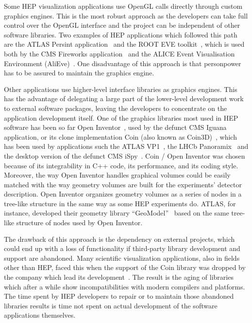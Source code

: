 \documentclass[12pt,a4paper]{article}
\begin{document}
Some HEP visualization applications use OpenGL calls directly through custom graphics engines. This is the most
robust approach as the developers can take full control over the OpenGL interface
and the project can be independent of other software libraries. Two examples of  HEP applications which followed this path are the
ATLAS Persint application~\cite{ATLASPersint2012} and the ROOT EVE toolkit~\cite{ROOTEVE2007}, which is used both by the CMS
Fireworks application~\cite{CMSFireworks} and the ALICE Event Visualisation Environment (AliEve)~\cite{alieve}.
One disadvantage of this approach is that personpower has to be assured to maintain the graphics engine.

Other applications use higher-level interface libraries as graphics engines. This has the advantage of delegating
a large part of the lower-level development work to external software packages, leaving the developers to concentrate
on the application development itself. One of the graphics libraries most used in HEP software has been so far
Open Inventor~\cite{OpenInventor1993}, used by the defunct CMS Iguana~\cite{CMSIguana} application, or its clone implementation
Coin (also known as Coin3D)~\cite{Coin3D}, which has been used by applications such the ATLAS VP1~\cite{ATLASVP12010},
the LHCb Panoramix~\cite{LHCbPanoramix} and the desktop version of the defunct CMS iSpy~\cite{CMSISpy}. Coin / Open Inventor was
chosen because of its integrability in C++ code, its performance, and its coding style. Moreover, the way Open Inventor handles
graphical volumes could be easily matched with the way geometry volumes are built for the experiments’ detector description.
Open Inventor organizes geometry volumes as a series of nodes in a tree-like structure in the same way as some
HEP experiments do. ATLAS, for instance, developed their geometry library “GeoModel”~\cite{ATLASGeoModel2004} based on
the same tree-like structure of nodes used by Open Inventor.

The drawback of this approach is the dependency on external projects, which could end up with a loss of functionality if
third-party library development and support are abandoned. Many scientific visualization applications, also in fields other than
HEP, faced this when the support of the Coin library was dropped by the company which lead its development~\cite{CoinEndOfLifeLetter}.
The result is the aging of libraries which after a while show incompatibilities with modern compilers and platforms. The time
spent by HEP developers to repair or to maintain those abandoned libraries results is time not spent on actual development
of the software applications themselves.
\end{document}
